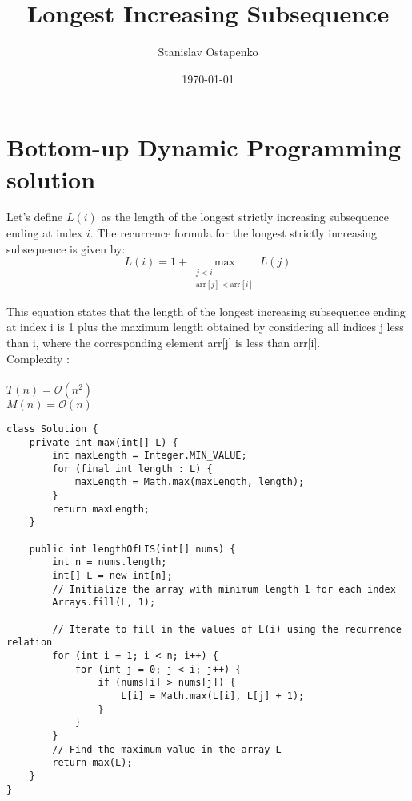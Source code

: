 \documentclass{article}
\begin{document}
    \title{Longest Increasing Subsequence}
    \author{Stanislav Ostapenko}
    \date{\today}
    \maketitle

\clearpage %

	\tableofcontents %
	\lstlistoflistings %

\clearpage %

    \section{Bottom-up Dynamic Programming solution}
    Let's define $L(i)$ as the length of the longest strictly increasing subsequence ending at index $i$.
    The recurrence formula for the longest strictly increasing subsequence is given by:
    \[ L(i) = 1 + \max_{\substack{j < i \\ \text{arr}[j] < \text{arr}[i]}} L(j) \]

    This equation states that the length of the longest increasing subsequence ending at index i is 1 plus the maximum length obtained by considering all indices j less than i, where the corresponding element arr[j] is less than arr[i].
    \\

    \noindent
    Complexity :\\
    \\
    \noindent
    $T(n) = \mathcal{O}(n^{2})$
    \\
    $M(n) = \mathcal{O}(n)$

    \begin{lstlisting}[caption=$\mathcal{O}(n^{2})$ DP solution]
class Solution {
	private int max(int[] L) {
		int maxLength = Integer.MIN_VALUE;
		for (final int length : L) {
			maxLength = Math.max(maxLength, length);
		}
		return maxLength;
	}
	
	public int lengthOfLIS(int[] nums) {
		int n = nums.length;
		int[] L = new int[n];
		// Initialize the array with minimum length 1 for each index
		Arrays.fill(L, 1);
		
		// Iterate to fill in the values of L(i) using the recurrence relation
		for (int i = 1; i < n; i++) {
			for (int j = 0; j < i; j++) {
				if (nums[i] > nums[j]) {
					L[i] = Math.max(L[i], L[j] + 1);
				}
			}
		}
		// Find the maximum value in the array L
		return max(L);
	}
}
    \end{lstlisting}
\end{document}
